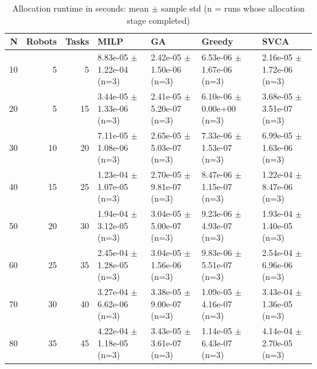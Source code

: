 \begin{table}[htbp]
\centering
\small
\caption{Allocation runtime in seconds: mean $\pm$ sample std (n = runs whose allocation stage completed)}
\label{tab:sample_demo_allocation_runtime}
\begin{tabular}{rrrllll}
\hline
N & Robots & Tasks & MILP & GA & Greedy & SVCA \\
\hline
10 & 5 & 5 & 8.83e-05 $\pm$ 1.22e-04 (n=3) & 2.42e-05 $\pm$ 1.50e-06 (n=3) & 6.53e-06 $\pm$ 1.67e-06 (n=3) & 2.16e-05 $\pm$ 1.72e-06 (n=3) \\
20 & 5 & 15 & 3.44e-05 $\pm$ 1.33e-06 (n=3) & 2.41e-05 $\pm$ 5.20e-07 (n=3) & 6.10e-06 $\pm$ 0.00e+00 (n=3) & 3.68e-05 $\pm$ 3.51e-07 (n=3) \\
30 & 10 & 20 & 7.11e-05 $\pm$ 1.08e-06 (n=3) & 2.65e-05 $\pm$ 5.03e-07 (n=3) & 7.33e-06 $\pm$ 1.53e-07 (n=3) & 6.99e-05 $\pm$ 1.63e-06 (n=3) \\
40 & 15 & 25 & 1.23e-04 $\pm$ 1.07e-05 (n=3) & 2.70e-05 $\pm$ 9.81e-07 (n=3) & 8.47e-06 $\pm$ 1.15e-07 (n=3) & 1.22e-04 $\pm$ 8.47e-06 (n=3) \\
50 & 20 & 30 & 1.94e-04 $\pm$ 3.12e-05 (n=3) & 3.04e-05 $\pm$ 5.00e-07 (n=3) & 9.23e-06 $\pm$ 4.93e-07 (n=3) & 1.93e-04 $\pm$ 1.40e-05 (n=3) \\
60 & 25 & 35 & 2.45e-04 $\pm$ 1.28e-05 (n=3) & 3.04e-05 $\pm$ 1.56e-06 (n=3) & 9.83e-06 $\pm$ 5.51e-07 (n=3) & 2.54e-04 $\pm$ 6.96e-06 (n=3) \\
70 & 30 & 40 & 3.27e-04 $\pm$ 6.62e-06 (n=3) & 3.38e-05 $\pm$ 9.00e-07 (n=3) & 1.09e-05 $\pm$ 4.16e-07 (n=3) & 3.43e-04 $\pm$ 1.36e-05 (n=3) \\
80 & 35 & 45 & 4.22e-04 $\pm$ 1.18e-05 (n=3) & 3.43e-05 $\pm$ 3.61e-07 (n=3) & 1.14e-05 $\pm$ 6.43e-07 (n=3) & 4.14e-04 $\pm$ 2.70e-05 (n=3) \\
\hline
\end{tabular}
\end{table}

